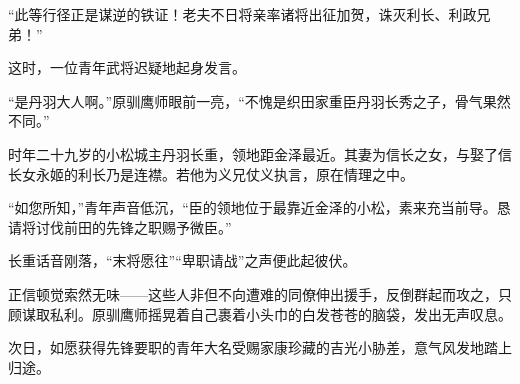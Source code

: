 \documentclass[
]{book}
\begin{document}
``此等行径正是谋逆的铁证！老夫不日将亲率诸将出征加贺，诛灭利长、利政兄弟！''

这时，一位青年武将迟疑地起身发言。

``是丹羽大人啊。''原驯鹰师眼前一亮，``不愧是织田家重臣丹羽长秀之子，骨气果然不同。''

时年二十九岁的小松城主丹羽长重，领地距金泽最近。其妻为信长之女，与娶了信长女永姬的利长乃是连襟。若他为义兄仗义执言，原在情理之中。

``如您所知，''青年声音低沉，``臣的领地位于最靠近金泽的小松，素来充当前导。恳请将讨伐前田的先锋之职赐予微臣。''

长重话音刚落，``末将愿往''``卑职请战''之声便此起彼伏。

正信顿觉索然无味------这些人非但不向遭难的同僚伸出援手，反倒群起而攻之，只顾谋取私利。原驯鹰师摇晃着自己裹着小头巾的白发苍苍的脑袋，发出无声叹息。

次日，如愿获得先锋要职的青年大名受赐家康珍藏的吉光小胁差，意气风发地踏上归途。

\printbibliography
\end{document}
